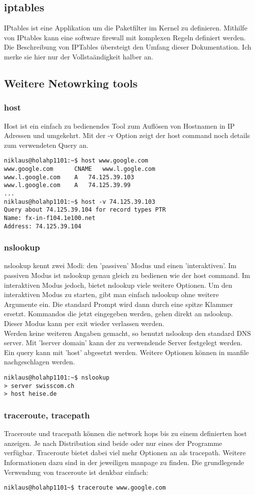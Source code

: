 \subsection{iptables}
IPtables ist eine Applikation um die Paketfilter im Kernel zu definieren. Mithilfe von IPtables kann eine software firewall mit komplexen Regeln definiert werden. Die Beschreibung von IPTables \"ubersteigt den Umfang dieser Dokumentation. Ich merke sie hier nur der Vollsta\"andigkeit halber an.
\subsection{Weitere Netowrking tools}
\subsubsection{host}
Host ist ein einfach zu bedienendes Tool zum Aufl\"osen von Hostnamen in IP Adressen und umgekehrt. Mit der -v Option zeigt der host command noch details zum verwendeten Query an.
\begin{lstlisting}
niklaus@holahp1101:~$ host www.google.com
www.google.com		CNAME	www.l.gogle.com
www.l.google.com	A	74.125.39.103
www.l.google.com	A	74.125.39.99
...
niklaus@holahp1101:~$ host -v 74.125.39.103
Query about 74.125.39.104 for record types PTR
Name: fx-in-f104.1e100.net
Address: 74.125.39.104
\end{lstlisting}
\subsubsection{nslookup}
nslookup kennt zwei Modi: den 'passiven' Modus und einen 'interaktiven'. Im passiven Modus ist nslookup genau gleich zu bedienen wie der host command. Im interaktiven Modus jedoch, bietet nslookup viele weitere Optionen. Um den interaktiven Modus zu starten, gibt man einfach nslookup ohne weitere Argumente ein. Die standard Prompt wird dann durch eine spitze Klammer ersetzt. Kommandos die jetzt eingegeben werden, gehen direkt an nslookup. Dieser Modus kann per exit wieder verlassen werden.\\
Werden keine weiteren Angaben gemacht, so benutzt nslookup den standard DNS server. Mit 'lserver domain' kann der zu verwendende Server festgelegt werden. Ein query kann mit 'host' abgesetzt werden. Weitere Optionen k\"onnen in manfile nachgeschlagen werden.
\begin{lstlisting}
niklaus@holahp1101:~$ nslookup
> server swisscom.ch
> host heise.de
\end{lstlisting}
\subsubsection{traceroute, tracepath}
Traceroute und tracepath k\"onnen die network hops bis zu einem definierten host anzeigen. Je nach Distribution sind beide oder nur eines der Programme verf\"ugbar. Traceroute bietet dabei viel mehr Optionen an als tracepath. Weitere Informationen dazu sind in der jeweiligen manpage zu finden. Die grundlegende Verwendung von traceroute ist denkbar einfach:
\begin{lstlisting}
niklaus@holahp1101~$ traceroute www.google.com
\end{lstlisting}
